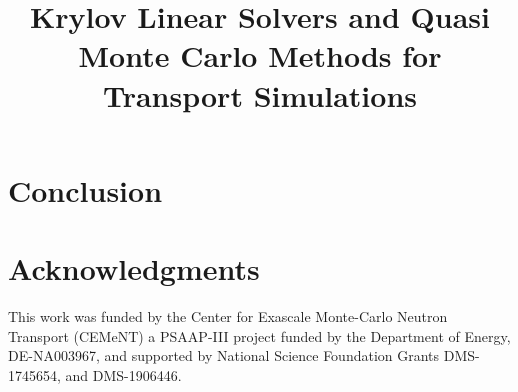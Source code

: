 \documentclass{nseJournal}
\begin{document}
\title{Krylov Linear Solvers and Quasi Monte Carlo Methods for Transport Simulations}


{}


\titlePage

\begin{abstract}

\end{abstract}









\clearpage


\section{Conclusion}
\label{sec:conclusion}


\pagebreak
\section*{Acknowledgments}


This work was funded by the Center for Exascale Monte-Carlo Neutron Transport (CEMeNT) a PSAAP-III project funded by the Department of Energy, DE-NA003967, 
%
and supported by National Science Foundation Grants
DMS-1745654,
and
DMS-1906446.


\pagebreak

\end{document}
